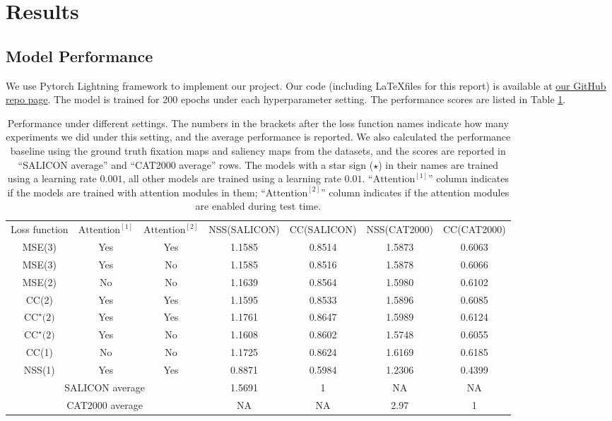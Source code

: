 \documentclass[12pt]{article}
\begin{document}
\section{Results}
\subsection{Model Performance}
We use Pytorch Lightning framework \cite{falcon2019pytorch} to implement our project. Our code (including \LaTeX files for this
report) is available at \href{https://github.com/Freddiechang/CMPUT566}{our GitHub repo page}.
The model is trained for 200 epochs under each hyperparameter setting. The performance scores are listed in Table \ref{tbl:performance}.
\begin{table}[h!]
    \begin{adjustwidth}{-2cm}{0cm}
    \begin{tabular}{ccc|cccc}
        \hline
	   Loss function & $\text{Attention}^{[1]}$ & $\text{Attention}^{[2]}$ & NSS(SALICON) & CC(SALICON) & NSS(CAT2000) & CC(CAT2000)\\
        MSE(3) & Yes & Yes & 1.1585 & 0.8514 & 1.5873 & 0.6063\\
        MSE(3) & Yes & No & 1.1585 & 0.8516 & 1.5878 & 0.6066\\
        MSE(2) & No & No & 1.1639 & 0.8564 & 1.5980 & 0.6102\\
        CC(2) & Yes & Yes & 1.1595 & 0.8533 & 1.5896 & 0.6085\\
        $\text{CC}^{\star}\text{(2)}$& Yes & Yes & 1.1761 & 0.8647 & 1.5989 & 0.6124\\
        $\text{CC}^{\star}\text{(2)}$& Yes & No & 1.1608 & 0.8602 & 1.5748 & 0.6055\\
        CC(1) & No & No & 1.1725 & 0.8624 & 1.6169 & 0.6185\\
        NSS(1) & Yes & Yes & 0.8871 & 0.5984 & 1.2306 & 0.4399\\
        \hline
        \multicolumn{3}{c}{SALICON average} & 1.5691 & 1 & NA & NA \\
        \multicolumn{3}{c}{CAT2000 average} & NA & NA & 2.97 & 1 \\
        \hline
    \end{tabular}
    \end{adjustwidth}
    \caption{Performance under different settings. The numbers in the brackets after the loss function names indicate
how many experiments we did under this setting, and the average performance is reported. We also calculated the performance
baseline using the ground truth fixation maps and saliency maps from the datasets, and the scores are reported in ``SALICON average''
and ``CAT2000 average'' rows. The models with a star sign ($\star$) in their names are trained using a learning rate $0.001$, all
other models are trained using a learning rate $0.01$. ``$\text{Attention}^{[1]}$'' column indicates if the models are trained with attention modules
in them; ``$\text{Attention}^{[2]}$'' column indicates if the attention modules are enabled during test time. }
    \label{tbl:performance}
\end{table}
\end{document}
